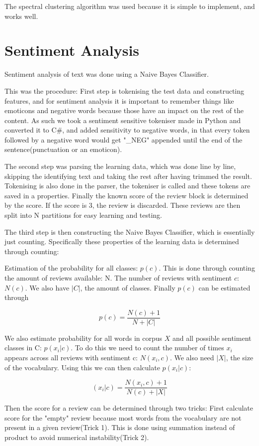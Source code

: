 	The spectral clustering algorithm was used because it is simple to implement, and works well.
	
	\section{Sentiment Analysis}
	Sentiment analysis of text was done using a Naive Bayes Classifier.
	
	This was the procedure:
	First step is tokenising the test data and constructing features, and for sentiment analysis it is important to remember things like emoticons and negative words because those have an impact on the rest of the content. As such we took a sentiment sensitive tokeniser made in Python and converted it to C\#, and added sensitivity to negative words, in that every token followed by a negative word would get "\_NEG" appended until the end of the sentence(punctuation or an emoticon).
	
	The second step was parsing the learning data, which was done line by line, skipping the identifying text and taking the rest after having trimmed the result. Tokenising is also done in the parser, the tokeniser is called and these tokens are saved in a properties. Finally the known score of the review block is determined by the score. If the score is 3, the review is discarded. These reviews are then split into N partitions for easy learning and testing.
	
	The third step is then constructing the Naive Bayes Classifier, which is essentially just counting. Specifically these properties of the learning data is determined through counting:
	
	Estimation of the probability for all classes: $p(c)$. This is done through counting the amount of reviews available: N. The number of reviews with sentiment $c$: $N(c)$. We also have $|C|$, the amount of classes. Finally $p(c)$ can be estimated through
	
	$$p(c) = \frac{N(c) + 1}{N +|C|}$$
	
	We also estimate probability for all words in corpus $X$ and all possible sentiment classes in C: $p(x_i | c)$. 
	To do this we need to count the number of times $x_i$ appears across all reviews with sentiment c: $N(x_i, c)$. We also need $|X|$, the size of the vocabulary. Using this we can then calculate $p(x_i|c)$:
	
	$$(x_i|c) = \frac{N(x_{i}, c) + 1}{N(c) + |X|}$$
	
	Then the score for a review can be determined through two tricks:
	First calculate score for the "empty" review because most words from the vocabulary are not present in a given review(Trick 1). This is done using summation instead of product to avoid numerical instability(Trick 2).
	

